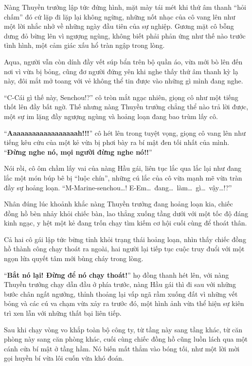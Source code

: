 \documentclass[../main.tex]{subfiles}
\begin{document}
Nàng Thuyền trưởng lập tức đứng hình, mặt mày tái mét khi thứ âm thanh ``hỏi chấm'' đó cứ lặp đi lặp lại không ngừng, những nốt nhạc của cô vang lên như một lời nhắc nhở về những ngày đầu tiên của sự nghiệp. Gương mặt cô bỗng dưng đỏ bừng lên vì ngượng ngùng, không biết phải phản ứng như thế nào trước tình hình, một cảm giác xấu hổ tràn ngập trong lòng.

Aqua, người vẫn còn dính đầy vết súp bẩn trên bộ quần áo, vừa mới bò lên đến nơi vì vừa bị bỏng, cũng đơ người đứng yên khi nghe thấy thứ âm thanh kỳ lạ này, đôi mắt mở toang với vẻ không thể tin được vào những gì mình đang nghe.

``C-Cái gì thế này, Senchou!?'' cô tròn mắt ngạc nhiên, giọng cô như một tiếng thốt lên đầy bất ngờ. Thế nhưng nàng Thuyền trưởng chẳng thể nào trả lời được, một sự im lặng đầy ngượng ngùng và hoảng loạn đang bao trùm lấy cô.

``\textbf{Aaaaaaaaaaaaaaaaaah!!!}'' cô hét lên trong tuyệt vọng, giọng cô vang lên như tiếng kêu cứu của một kẻ vừa bị phơi bày ra bí mật đen tối nhất của mình. ``\textbf{Đừng nghe nó, mọi người đừng nghe nó!!}''

Nói rồi, cô ôm chầm lấy vai của nàng Hầu gái, liên tục lắc qua lắc lại như đang lắc một món búp bê bị ``luộc chín'', những cú lắc của cô vừa mạnh mẽ vừa tràn đầy sự hoảng loạn. ``M-Marine-senchou\dots! E-Em\dots\ đang\dots\ làm\dots\ gì\dots\ vậy\dots!?''

Nhân đúng lúc khoảnh khắc nàng Thuyền trưởng đang hoảng loạn kia, chiếc đồng hồ bèn nhảy khỏi chiếc bàn, lao thẳng xuống tầng dưới với một tốc độ đáng kinh ngạc, y hệt một kẻ đang trốn chạy tìm kiếm cơ hội cuối cùng để thoát thân.

Cả hai cô gái lập tức bừng tỉnh khỏi trạng thái hoảng loạn, nhìn thấy chiếc đồng hồ thành công chạy thoát ra ngoài, hai người lại tiếp tục cuộc truy đuổi với một ngọn lửa quyết tâm mới bùng cháy trong lòng.

``\textbf{Bắt nó lại! Đừng để nó chạy thoát!}'' họ đồng thanh hét lên, với nàng Thuyền trưởng chạy dẫn đầu ở phía trước, nàng Hầu gái thì đi sau với những bước chân ngất ngưởng, thỉnh thoảng lại vấp ngã rầm xuống đất vì những vết bỏng và các cú va chạm vừa xảy ra trước đó, một hình ảnh vừa thể hiện sự kiên trì xen lẫn với những thất bại liên tiếp.

\ct

Sau khi chạy vòng vo khắp toàn bộ công ty, từ tầng này sang tầng khác, từ căn phòng này sang căn phòng khác, cuối cùng chiếc đồng hồ cũng luồn lách qua một cánh cửa bí mật ở tầng hầm. Nó biến mất thẳm vào bóng tối, như một lời mời gọi huyền bí vừa lôi cuốn vừa khó đoán.
\end{document}
